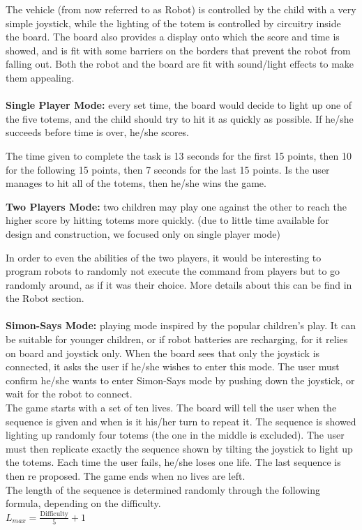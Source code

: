 \documentclass[a4paper,twoside]{book}
\begin{document}
The vehicle (from now referred to as Robot) is controlled by the child with a very simple joystick, while the lighting of the totem is controlled by circuitry inside the board. The board also provides a display onto which the score and time is showed, and is fit with some barriers on the borders that prevent the robot from falling out. Both the robot and the board are fit with sound/light effects to make them appealing.
\\
\\
\textbf{Single Player Mode:} every set time, the board would decide to light up one of the five totems, and the child should try to hit it as quickly as possible. If he/she succeeds before time is over, he/she scores.

The time given to complete the task is 13 seconds for the first 15 points, then 10 for the following 15 points, then 7 seconds for the last 15 points. Is the user manages to hit all of the totems, then he/she wins the game.


\textbf{Two Players Mode:} two children may play one against the other to reach the higher score by hitting totems more quickly.
(due to little time available for  design and construction, we focused only on single player mode)

In order to even the abilities of the two players, it would be interesting to program robots to randomly not execute the command from players but to go randomly around, as if it was their choice. More details about this can be find in the Robot section.
\\
\\
\textbf{Simon-Says Mode:} playing mode inspired by the popular children's play. It can be suitable for younger children, or if robot batteries are recharging, for it relies on board and joystick only. When the board sees that only the joystick is connected, it asks the user if he/she wishes to enter this mode. The user must confirm he/she wants to enter Simon-Says mode by pushing down the joystick, or wait for the robot to connect. 
\\
The game starts with a set of ten lives. The board will tell the user when the sequence is given and when is it his/her turn to repeat it. The sequence is showed lighting up randomly four totems (the one in the middle is excluded). The user must then replicate exactly the sequence shown by tilting the joystick to light up the totems. Each time the user fails, he/she loses one life. The last sequence is then re proposed.  The game ends when no lives are left.
\\
The length of the sequence is determined randomly through the following formula, depending on the difficulty. 
\\
$L_{max} = \frac{\mathrm{Difficulty}}{5}+1$
\end{document}
